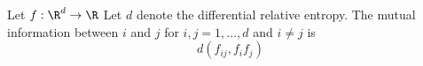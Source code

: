 



Let $f: \R^d \to \R$
Let $d$ denote the differential relative
entropy.
The mutual information between
$i$ and $j$ for $i,j = 1, \dots, d$
and $i \neq j$ is
\[
  d(f_{ij}, f_{i}f_{j})
\]
